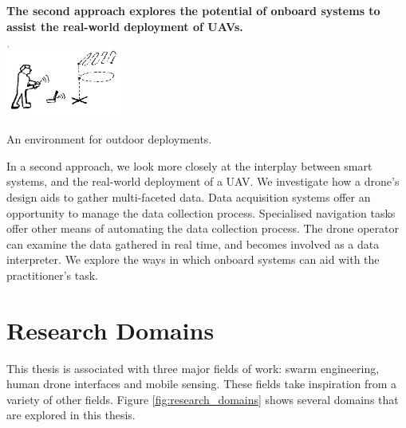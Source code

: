 \textbf{The second approach explores the potential of  onboard systems to assist the real-world deployment of UAVs.}
\begin{marginfigure}%
  \includegraphics[width=4cm]{images/intro/outputonlinejpgtools.jpg}
  \caption{An environment for outdoor deployments.}
  \label{fig:approachB}
\end{marginfigure}
In a second approach, we look more closely at the interplay between smart systems, and the real-world deployment of a UAV. We investigate how a drone's design aids to gather multi-faceted data. Data acquisition systems offer an opportunity to manage the data collection process. Specialised navigation tasks offer other means of automating the data collection process. The drone operator can examine the data gathered in real time, and becomes involved as a data interpreter. We explore the ways in which onboard systems can aid with the practitioner’s task.


\section{Research Domains}

This thesis is associated with three major fields of work: swarm engineering, human drone interfaces and mobile sensing. These fields take inspiration from a variety of other fields. Figure \ref{fig:research_domains} shows several domains that are explored in this thesis.



